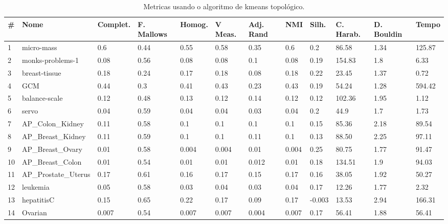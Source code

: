 \documentclass[sn-mathphys,Numbered]{sn-jnl}%
\theoremstyle{thmstyleone}%
\theoremstyle{thmstyletwo}%
\theoremstyle{thmstylethree}%
\begin{document}
\begin{table}[ht]
    \centering
    \footnotesize
    \setlength{\tabcolsep}{4pt}
    \caption{Metricas usando o algoritmo de kmeans topológico.}
    \begin{tabular}{@{}p{0.1cm}p{2.3cm}p{1.3cm}p{1cm}p{1cm}p{0.8cm}p{1cm}p{1cm}p{0.8cm}p{1cm}p{1cm}p{0.8cm}@{}}
        \toprule
        \textbf{\#} & 
        \textbf{Nome} & 
        \textbf{Complet.} & 
        \textbf{F. Mallows} & 
        \textbf{Homog.} & 
        \textbf{V Meas.} & 
        \textbf{Adj. Rand} & 
        \textbf{NMI} & 
        \textbf{Silh.} & 
        \textbf{C. Harab.} & 
        \textbf{D. Bouldin} & 
        \textbf{Tempo} \\
        \midrule
        1 & micro-mass & 0.6 & 0.44 & 0.55 & 0.58 & 0.35 & 0.6 & 0.2 & 86.58 & 1.34 & 125.87 \\
        2 & monks-problems-1 & 0.08 & 0.56 & 0.08 & 0.08 & 0.1 & 0.08 & 0.19 & 154.83 & 1.8 & 6.33 \\
        3 & breast-tissue & 0.18 & 0.24 & 0.17 & 0.18 & 0.08 & 0.18 & 0.22 & 23.45 & 1.37 & 0.72 \\
        4 & GCM & 0.44 & 0.3 & 0.41 & 0.43 & 0.23 & 0.43 & 0.19 & 54.24 & 1.28 & 594.42 \\
        5 & balance-scale & 0.12 & 0.48 & 0.13 & 0.12 & 0.14 & 0.12 & 0.12 & 102.36 & 1.95 & 1.12 \\
        6 & servo & 0.04 & 0.59 & 0.04 & 0.04 & 0.03 & 0.04 & 0.2 & 44.9 & 1.7 & 1.73 \\
        7 & AP\_Colon\_Kidney & 0.11 & 0.58 & 0.1 & 0.1 & 0.1 & 0.1 & 0.15 & 85.36 & 2.18 & 89.54 \\
        8 & AP\_Breast\_Kidney & 0.11 & 0.59 & 0.1 & 0.1 & 0.11 & 0.1 & 0.13 & 88.50 & 2.25 & 97.11 \\
        9 & AP\_Breast\_Ovary & 0.01 & 0.58 & 0.004 & 0.004 & 0.01 & 0.004 & 0.25 & 80.75 & 1.77 & 91.47 \\
        10 & AP\_Breast\_Colon & 0.01 & 0.54 & 0.01 & 0.01 & 0.012 & 0.01 & 0.18 & 134.51 & 1.9 & 94.03 \\
        11 & AP\_Prostate\_Uterus & 0.17 & 0.61 & 0.16 & 0.17 & 0.15 & 0.17 & 0.16 & 38.05 & 1.92 & 50.27 \\
        12 & leukemia & 0.05 & 0.58 & 0.03 & 0.04 & 0.03 & 0.04 & 0.17 & 12.26 & 1.77 & 2.32 \\
        13 & hepatitisC & 0.15 & 0.65 & 0.22 & 0.17 & 0.09 & 0.17 & -0.003 & 13.53 & 2.94 & 166.31 \\
        14 & Ovarian & 0.007 & 0.54 & 0.007 & 0.007 & 0.004 & 0.007 & 0.17 & 56.41 & 1.88 & 56.41 \\

\end{tabular}
\end{table}
\end{document}
